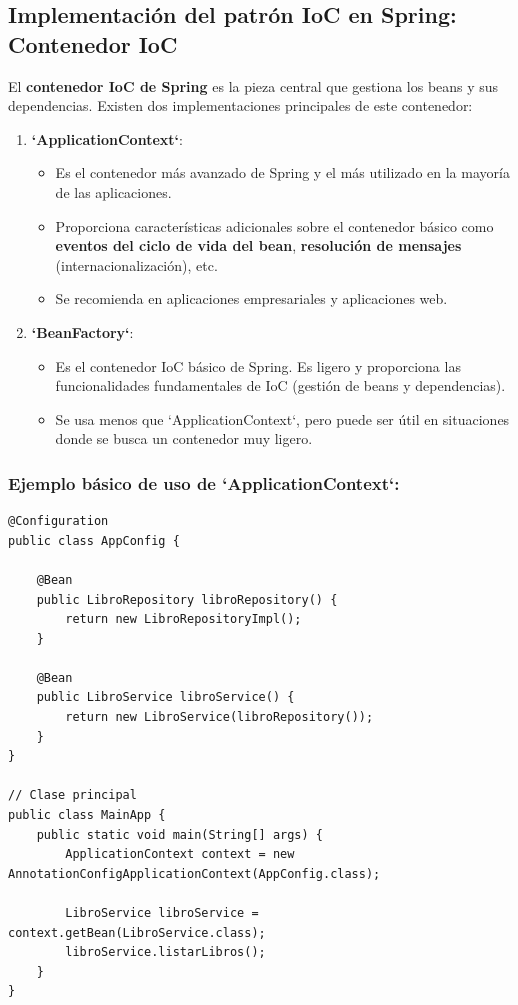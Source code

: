 \documentclass[11pt]{article}
\begin{document}
\subsection{Implementación del patrón IoC en Spring: Contenedor IoC}
\label{sec:orgf51a912}
El \textbf{\textbf{contenedor IoC de Spring}} es la pieza central que gestiona los beans y sus dependencias. Existen dos implementaciones principales de este contenedor:

\begin{enumerate}
\item \textbf{\textbf{`ApplicationContext`}}:
\begin{itemize}
\item Es el contenedor más avanzado de Spring y el más utilizado en la mayoría de las aplicaciones.
\item Proporciona características adicionales sobre el contenedor básico como \textbf{\textbf{eventos del ciclo de vida del bean}}, \textbf{\textbf{resolución de mensajes}} (internacionalización), etc.
\item Se recomienda en aplicaciones empresariales y aplicaciones web.
\end{itemize}

\item \textbf{\textbf{`BeanFactory`}}:
\begin{itemize}
\item Es el contenedor IoC básico de Spring. Es ligero y proporciona las funcionalidades fundamentales de IoC (gestión de beans y dependencias).
\item Se usa menos que `ApplicationContext`, pero puede ser útil en situaciones donde se busca un contenedor muy ligero.
\end{itemize}
\end{enumerate}

\subsubsection{Ejemplo básico de uso de `ApplicationContext`:}
\label{sec:org423884b}
\begin{verbatim}
@Configuration
public class AppConfig {

    @Bean
    public LibroRepository libroRepository() {
        return new LibroRepositoryImpl();
    }

    @Bean
    public LibroService libroService() {
        return new LibroService(libroRepository());
    }
}

// Clase principal
public class MainApp {
    public static void main(String[] args) {
        ApplicationContext context = new AnnotationConfigApplicationContext(AppConfig.class);

        LibroService libroService = context.getBean(LibroService.class);
        libroService.listarLibros();
    }
}
\end{verbatim}
\end{document}
